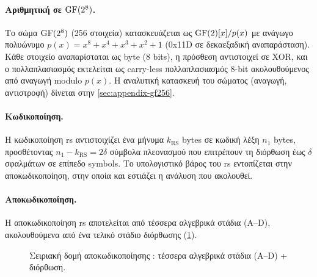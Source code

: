 \paragraph{Αριθμητική σε $\mathrm{GF}(2^8)$.}
Το σώμα $\mathrm{GF}(2^8)$ (256 στοιχεία) κατασκευάζεται ως $\mathrm{GF}(2)[x] / p(x)$ με ανάγωγο
πολυώνυμο $p(x) = x^8 + x^4 + x^3 + x^2 + 1$ (0x11D σε δεκαεξαδική
αναπαράσταση).
Κάθε στοιχείο αναπαρίσταται ως byte (8 bits), η πρόσθεση αντιστοιχεί σε
XOR, και ο πολλαπλασιασμός εκτελείται ως carry-less πολλαπλασιασμός 8-bit
ακολουθούμενος από αναγωγή modulo $p(x)$.
Η αναλυτική κατασκευή του σώματος (αναγωγή, αντιστροφή) δίνεται στην \cref{sec:appendix-gf256}.

\paragraph{Κωδικοποίηση.}
Η κωδικοποίηση \gls{rs} αντιστοιχίζει ένα μήνυμα $k_{\mathrm{RS}}$ bytes σε κωδική
λέξη $n_1$ bytes, προσθέτοντας $n_1 - k_{\mathrm{RS}} = 2\delta$
σύμβολα πλεονασμού που επιτρέπουν τη διόρθωση έως $\delta$ σφαλμάτων σε επίπεδο
symbols. Το υπολογιστικό βάρος του \gls{rs} εντοπίζεται στην αποκωδικοποίηση, στην
οποία και εστιάζει η ανάλυση που ακολουθεί.

\paragraph{Αποκωδικοποίηση.}
Η αποκωδικοποίηση \gls{rs} αποτελείται από τέσσερα αλγεβρικά στάδια (A–D),
ακολουθούμενα από ένα τελικό στάδιο διόρθωσης (\cref{fig:rs-pipeline}).

\begin{figure}[htbp]
  \centering
  \resizebox{\linewidth}{!}{}
  \caption[Σειριακή δομή αποκωδικοποίησης RS]{Σειριακή δομή αποκωδικοποίησης : τέσσερα αλγεβρικά στάδια
    (A–D) + διόρθωση.}
  \label{fig:rs-pipeline}
\end{figure}

